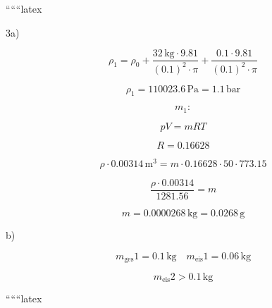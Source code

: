 
``````latex

3a) 

\[
\rho_1 = \rho_0 + \frac{32 \, \text{kg} \cdot 9.81}{(0.1)^2 \cdot \pi} + \frac{0.1 \cdot 9.81}{(0.1)^2 \cdot \pi}
\]

\[
\rho_1 = 110023.6 \, \text{Pa} = 1.1 \, \text{bar}
\]

\[
m_1:
\]

\[
pV = mRT
\]

\[
R = 0.16628
\]

\[
\rho \cdot 0.00314 \, \text{m}^3 = m \cdot 0.16628 \cdot 50 \cdot 773.15
\]

\[
\frac{\rho \cdot 0.00314}{1281.56} = m
\]

\[
m = 0.0000268 \, \text{kg} = 0.0268 \, \text{g}
\]

b) 

\[
m_{\text{ges}} 1 = 0.1 \, \text{kg} \quad m_{\text{eis}} 1 = 0.06 \, \text{kg}
\]

\[
m_{\text{eis}} 2 > 0.1 \, \text{kg}
\]

``````latex


